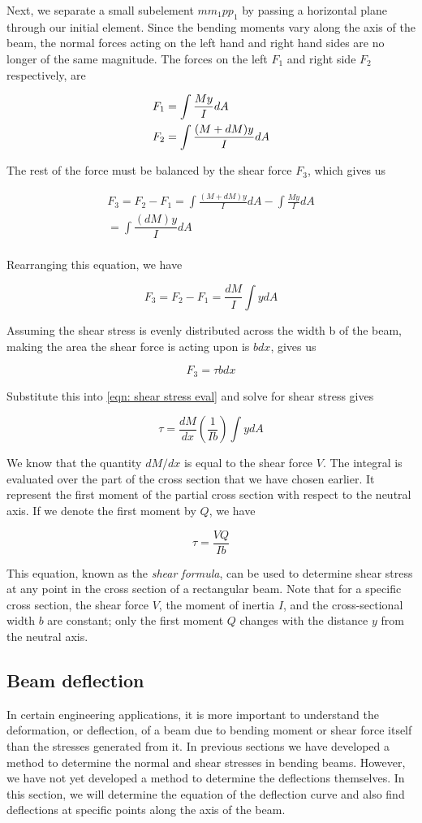 \documentclass[a4paper,openany,12pt]{book}
\begin{document}
Next, we separate a small subelement \(mm_1pp_1\) by passing a horizontal
plane through our initial element. Since the bending moments vary along
the axis of the beam, the normal forces acting on the left hand and
right hand sides are no longer of the same magnitude. The forces on the
left \(F_1\) and right side \(F_2\) respectively, are

$$\begin{gathered}
    F_1 = \int \frac{My}{I}dA \hfill \\
    F_2 = \int \frac{(M + dM)y}{I}dA \hfill\end{gathered}$$

The rest of the force must be balanced by the shear force \(F_3\), which
gives us

$$\begin{gathered}
  F_3 = F_2 - F_1 = \int \frac{(M + dM)y}{I}dA  - \int \frac{My}{I}dA  \\ 
   = \int \dfrac{(dM)y}{I}dA \\ 
 \end{gathered}$$

Rearranging this equation, we have

$$ F_3 = F_2 - F_1 = \frac{dM}{I}\int y dA$$

Assuming the shear stress is evenly distributed across the width b of
the beam, making the area the shear force is acting upon is \(bdx\), gives
us

$$F_3 = \tau bdx$$

Substitute this into \ref{eqn: shear stress eval} and solve for
shear stress gives

$$\tau  = \frac{dM}{dx}\left( \frac{1}{Ib} \right) \int ydA$$

We know that the quantity \(dM/dx\) is equal to the shear force \(V\). The
integral is evaluated over the part of the cross section that we have
chosen earlier. It represent the first moment of the partial cross
section with respect to the neutral axis. If we denote the first moment
by \(Q\), we have

$$\tau  = \frac{VQ}{Ib}$$

This equation, known as the \emph{shear formula}, can be used to determine
shear stress at any point in the cross section of a rectangular beam.
Note that for a specific cross section, the shear force \(V\), the moment
of inertia \(I\), and the cross-sectional width \(b\) are constant; only the
first moment \(Q\) changes with the distance \(y\) from the neutral axis.

\subsection{Beam deflection}
\label{subsection: beam deflection}
In certain engineering applications, it is more important to understand
the deformation, or deflection, of a beam due to bending moment or shear
force itself than the stresses generated from it. In previous sections
we have developed a method to determine the normal and shear stresses in
bending beams. However, we have not yet developed a method to determine
the deflections themselves. In this section, we will determine the
equation of the deflection curve and also find deflections at specific
points along the axis of the beam.
\end{document}
